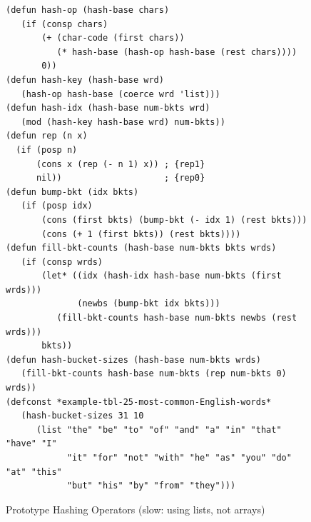 \begin{figure}
\begin{center}
\begin{code}
\begin{verbatim}
(defun hash-op (hash-base chars)
   (if (consp chars)
       (+ (char-code (first chars))
          (* hash-base (hash-op hash-base (rest chars))))
       0))
(defun hash-key (hash-base wrd)
   (hash-op hash-base (coerce wrd 'list)))
(defun hash-idx (hash-base num-bkts wrd)
   (mod (hash-key hash-base wrd) num-bkts))
(defun rep (n x)
  (if (posp n)
      (cons x (rep (- n 1) x)) ; {rep1}
      nil))                    ; {rep0}
(defun bump-bkt (idx bkts)
   (if (posp idx)
       (cons (first bkts) (bump-bkt (- idx 1) (rest bkts)))
       (cons (+ 1 (first bkts)) (rest bkts))))
(defun fill-bkt-counts (hash-base num-bkts bkts wrds)
   (if (consp wrds)
       (let* ((idx (hash-idx hash-base num-bkts (first wrds)))
              (newbs (bump-bkt idx bkts)))
          (fill-bkt-counts hash-base num-bkts newbs (rest wrds)))
       bkts))
(defun hash-bucket-sizes (hash-base num-bkts wrds)
   (fill-bkt-counts hash-base num-bkts (rep num-bkts 0) wrds))
(defconst *example-tbl-25-most-common-English-words*
   (hash-bucket-sizes 31 10
      (list "the" "be" "to" "of" "and" "a" "in" "that" "have" "I"
            "it" "for" "not" "with" "he" "as" "you" "do" "at" "this"
            "but" "his" "by" "from" "they")))
\end{verbatim}
\end{code}
\caption{Prototype Hashing Operators (slow: using lists, not arrays)}
\label{fig:hash-defuns}
\end{center}
\end{figure}

